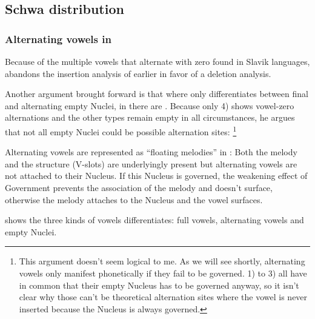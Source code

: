 \subsection{Schwa distribution}

\subsubsection{Alternating vowels in \CVCV}
Because of the multiple vowels that alternate with zero found in Slavik
languages, \cite{scheer2004} abandons the insertion analysis of earlier
\SGP in favor of a deletion analysis.

Another argument brought forward is that where \SGP only differentiates
between final and alternating empty Nuclei, in \CVCV there are
.
Because only 4) shows vowel-zero alternations and the other types
remain empty in all circumstances, he argues that not all empty
Nuclei could be possible alternation sites:
%
\footnote{This argument doesn't seem logical to me.
  As we will see shortly, alternating vowels only manifest phonetically
  if they fail to be governed. 1) to 3) all have in common
  that their empty Nucleus has to be governed anyway, so it isn't
  clear why those can't be theoretical alternation sites where
  the vowel is never inserted because the Nucleus is always governed.}

Alternating vowels are represented as \enquote{floating melodies} in \CVCV:
Both the melody and the structure (V-slots) are underlyingly present
but alternating vowels are not attached to their Nucleus.
If this Nucleus is governed, the weakening effect of Government
prevents the association of the melody and doesn't surface, otherwise
the melody attaches to the Nucleus and the vowel surfaces.

 shows the three kinds of vowels
\CVCV differentiates: full vowels, alternating vowels and empty Nuclei.


